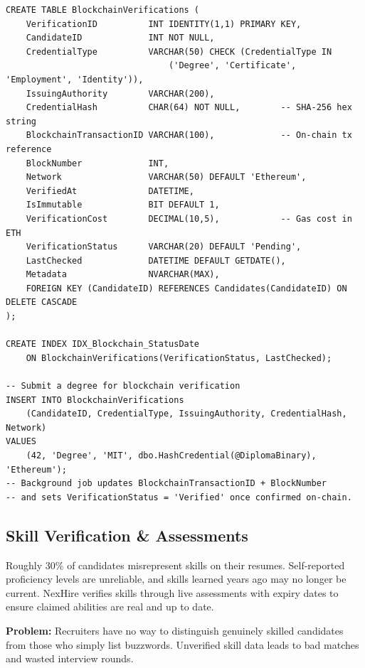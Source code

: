 \documentclass[11pt,a4paper]{article}
\begin{document}
\begin{verbatim}
CREATE TABLE BlockchainVerifications (
    VerificationID          INT IDENTITY(1,1) PRIMARY KEY,
    CandidateID             INT NOT NULL,
    CredentialType          VARCHAR(50) CHECK (CredentialType IN
                                ('Degree', 'Certificate', 'Employment', 'Identity')),
    IssuingAuthority        VARCHAR(200),
    CredentialHash          CHAR(64) NOT NULL,        -- SHA-256 hex string
    BlockchainTransactionID VARCHAR(100),             -- On-chain tx reference
    BlockNumber             INT,
    Network                 VARCHAR(50) DEFAULT 'Ethereum',
    VerifiedAt              DATETIME,
    IsImmutable             BIT DEFAULT 1,
    VerificationCost        DECIMAL(10,5),            -- Gas cost in ETH
    VerificationStatus      VARCHAR(20) DEFAULT 'Pending',
    LastChecked             DATETIME DEFAULT GETDATE(),
    Metadata                NVARCHAR(MAX),
    FOREIGN KEY (CandidateID) REFERENCES Candidates(CandidateID) ON DELETE CASCADE
);

CREATE INDEX IDX_Blockchain_StatusDate
    ON BlockchainVerifications(VerificationStatus, LastChecked);

-- Submit a degree for blockchain verification
INSERT INTO BlockchainVerifications
    (CandidateID, CredentialType, IssuingAuthority, CredentialHash, Network)
VALUES
    (42, 'Degree', 'MIT', dbo.HashCredential(@DiplomaBinary), 'Ethereum');
-- Background job updates BlockchainTransactionID + BlockNumber
-- and sets VerificationStatus = 'Verified' once confirmed on-chain.
\end{verbatim}



\subsection{Skill Verification \& Assessments}

\noindent
Roughly 30\% of candidates misrepresent skills on their resumes. Self-reported proficiency levels are unreliable, and skills learned years ago may no longer be current. NexHire verifies skills through live assessments with expiry dates to ensure claimed abilities are real and up to date.

\textbf{Problem:} Recruiters have no way to distinguish genuinely skilled candidates from those who simply list buzzwords. Unverified skill data leads to bad matches and wasted interview rounds.
\end{document}
